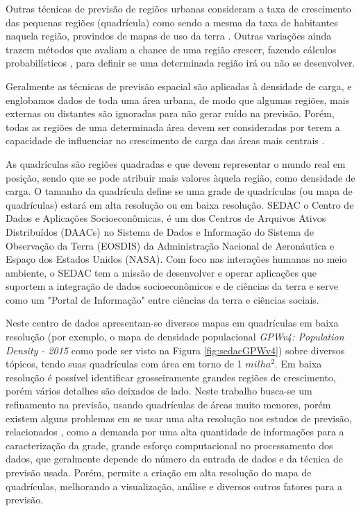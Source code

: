 Outras técnicas de previsão de regiões urbanas consideram a taxa de crescimento das pequenas regiões (quadrícula) como sendo a mesma da taxa de habitantes naquela região, provindos de mapas de uso da terra \cite{wu2002data}. Outras variações ainda trazem métodos que avaliam a chance de uma região crescer, fazendo cálculos probabilísticos \cite{melo2015spatial}, \cite{arango2004spatial} para definir se uma determinada região irá ou não se desenvolver.

Geralmente as técnicas de previsão espacial são aplicadas à densidade de carga, e englobamos dados de toda uma área urbana\cite{willis2007spatial}, de modo que algumas regiões, mais externas ou distantes são ignoradas para não gerar ruído na previsão. Porém, todas as regiões de uma determinada área devem ser consideradas por terem a capacidade de influenciar no crescimento de carga das áreas mais centrais \cite{willis2002spatial}.

As quadrículas são regiões quadradas e que devem representar o mundo real em posição, sendo que se pode atribuir mais valores àquela região, como densidade de carga. O tamanho da quadrícula define se uma grade de quadrículas (ou mapa de quadrículas) estará em alta resolução ou em baixa resolução. SEDAC o Centro de Dados e Aplicações Socioeconômicas, é um dos Centros de Arquivos Ativos Distribuídos (DAACs) no Sistema de Dados e Informação do Sistema de Observação da Terra (EOSDIS) da Administração Nacional de Aeronáutica e Espaço dos Estados Unidos (NASA). Com foco nas interações humanas no meio ambiente, o SEDAC tem a missão de desenvolver e operar aplicações que suportem a integração de dados socioeconômicos e de ciências da terra e serve como um "Portal de Informação" entre ciências da terra e ciências sociais. 

Neste centro de dados apresentam-se diversos mapas em quadrículas em baixa resolução (por exemplo, o mapa de densidade populacional \emph{GPWv4: Population Density - 2015} \cite{SEDAC2016} como pode ser visto na Figura \ref{fig:sedacGPWv4}) sobre diversos tópicos, tendo suas quadrículas com área em torno de 1 \(milha^2\). Em baixa resolução é possível identificar grosseiramente grandes regiões de crescimento, porém vários detalhes são deixados de lado. Neste trabalho busca-se um refinamento na previsão, usando quadrículas de áreas muito menores, porém existem alguns problemas em se usar uma alta resolução nos estudos de previsão, relacionados \cite{longley1996spatial}, como a demanda por uma alta quantidade de informações para a caracterização da grade, grande esforço computacional no processamento dos dados, que geralmente depende do número da entrada de dados e da técnica de previsão usada. Porém, permite a criação em alta resolução do mapa de quadrículas, melhorando a visualização, análise e diversos outros fatores para a previsão. 

